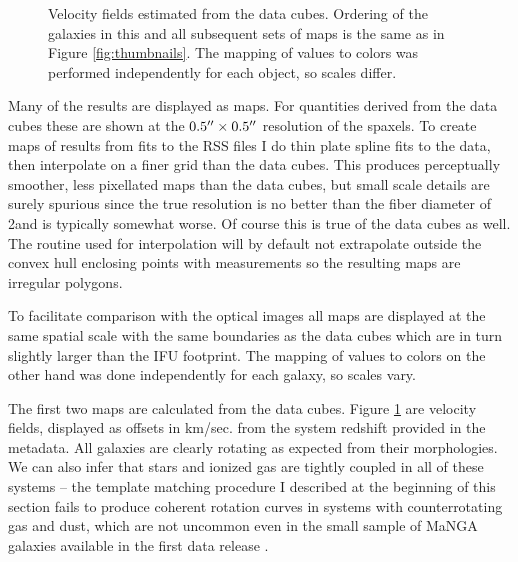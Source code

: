 \documentclass[modern]{aastex62}
\begin{document}
\begin{figure}[ht]
\caption{Velocity fields estimated from the data cubes. Ordering of the galaxies in this and all subsequent sets of maps is the same as in Figure \ref{fig:thumbnails}. The mapping of values to colors was performed independently for each object, so scales differ.}
\label{fig:vfs}
\end{figure}

Many of the results are displayed as maps. For quantities derived from the data cubes these are shown at the $0.5\mbox{$^{\prime\prime}$} \times 0.5\mbox{$^{\prime\prime}$}$ resolution of the spaxels. To create maps of results from fits to the RSS files I do thin plate spline fits to the data, then interpolate on a finer grid than the data cubes. This produces perceptually smoother, less pixellated maps than the data cubes, but small scale details are surely spurious since the true resolution is no better than the fiber diameter of 2\arcsec and is typically somewhat worse. Of course this is true of the data cubes as well. The routine used for interpolation will by default not extrapolate outside the convex hull enclosing points with measurements so the resulting maps are irregular polygons. 

To facilitate comparison with the optical images all maps are displayed at the same spatial scale with the same boundaries as the data cubes which are in turn slightly larger than the IFU footprint. The mapping of values to colors on the other hand was done independently for each galaxy, so scales vary.

The first two maps are calculated from the data cubes. Figure \ref{fig:vfs} are velocity fields, displayed as offsets in km/sec. from the system redshift provided in the metadata. All galaxies are clearly rotating as expected from their morphologies. We can also infer that stars and ionized gas are tightly coupled in all of these systems -- the template matching procedure I described at the beginning of this section fails to produce coherent rotation curves in systems with counterrotating gas and dust, which are not uncommon even in the small sample of MaNGA galaxies available in the first data release \citep{2016MNRAS.463..913J}.
\end{document}
